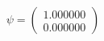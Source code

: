 \documentclass[preview]{standalone}
\begin{document}
\begin{align*}
\psi = \begin{pmatrix} 1.000000 \\ 0.000000 \end{pmatrix}
\end{align*}
\end{document}
